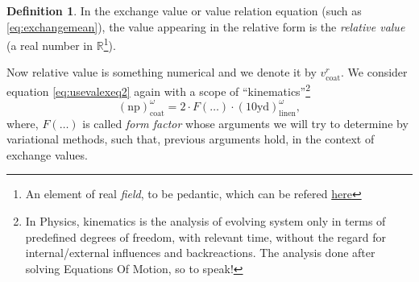 \documentclass[12pt]{extarticle}
\theoremstyle{definition}
\newtheorem{definition}{Definition}[section]
\begin{document}
\begin{definition}
  \label{def:relval}
  In the exchange value or value relation equation (such as \ref{eq:exchangemean}), the value appearing in the relative form is the \emph{relative value} (a real number in $\mathbb{R}$\footnote{An element of real \emph{field}, to be pedantic, which can be refered \href{https://en.wikipedia.org/wiki/Field_(mathematics)}{here}}).
\end{definition}

Now relative value is something numerical and we denote it by $v_{\text{coat}}^{r}$.  We consider equation \ref{eq:usevalexeq2} again with a scope of ``kinematics''\footnote{In Physics, kinematics is the analysis of evolving system only in terms of predefined degrees of freedom, with relevant time, without the regard for internal/external influences and backreactions.  The analysis done after solving Equations Of Motion, so to speak!}
\begin{equation}
  \label{eq:valreltestvar}
  (\text{np})_{\text{coat}}^{\omega} = 2\cdot F(\ldots)\cdot (10\text{yd})_{\text{linen}}^{\omega},
\end{equation}
where, $F(\ldots)$ is called \emph{form factor} whose arguments we will try to determine by variational methods, such that, previous arguments hold, in the context of exchange values.
\end{document}
